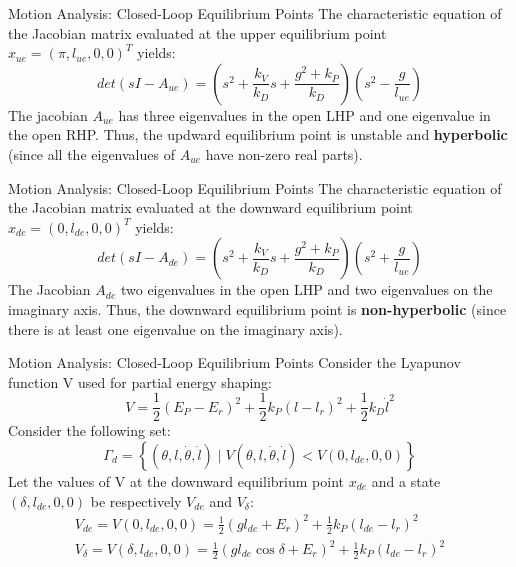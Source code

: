 \documentclass[10pt]{beamer}
\begin{document}
  \begin{frame}{Motion Analysis: Closed-Loop Equilibrium Points}
    The characteristic equation of the Jacobian matrix evaluated
    at the upper equilibrium point $x_{ue} = (\pi, l_{ue}, 0, 0)^T$
    yields:
    \begin{equation*}
      det(sI-A_{ue}) = \left( s^2 + \frac{k_V}{k_D}s +
        \frac{g^2+k_P}{k_D} \right) \left( s^2 - \frac{g}{l_{ue}}\right)
    \end{equation*}
    The jacobian $A_{ue}$ has three eigenvalues in the open LHP and
    one eigenvalue in the open RHP. Thus, the updward equilibrium point
    is unstable and \textbf{hyperbolic} (since all the eigenvalues of $A_{ue}$
    have non-zero real parts).
  \end{frame}

  \begin{frame}{Motion Analysis: Closed-Loop Equilibrium Points}
    The characteristic equation of the Jacobian matrix evaluated
    at the downward equilibrium point $x_{de} = (0, l_{de}, 0, 0)^T$ yields:
    \begin{equation*}
      det(sI-A_{de}) = \left( s^2 + \frac{k_V}{k_D}s +
        \frac{g^2+k_P}{k_D} \right) \left( s^2 + \frac{g}{l_{ue}}\right)
    \end{equation*}
    The Jacobian $A_{de}$ two eigenvalues in the open LHP and two
    eigenvalues on the imaginary axis. Thus, the downward equilibrium
    point is \textbf{non-hyperbolic} (since there
    is at least one eigenvalue on the imaginary axis).
  \end{frame}

  \begin{frame}{Motion Analysis: Closed-Loop Equilibrium Points}
    Consider the Lyapunov function V used for partial energy shaping:
    \begin{equation*}
      V = \frac{1}{2}(E_P-E_r)^2+\frac{1}{2}k_P(l-l_r)^2+
        \frac{1}{2}k_D\dot{l}^2
    \end{equation*}
    Consider the following set:
    \begin{equation*}
      \Gamma_d = \left\{ (\theta, l, \dot{\theta}, \dot{l})
        \mid V(\theta, l, \dot{\theta}, \dot{l}) <
        V(0, l_{de}, 0, 0) \right\}
    \end{equation*}
    Let the values of V at the downward equilibrium point $x_{de}$
    and a state $(\delta, l_{de}, 0, 0)$ be respectively $V_{de}$
    and $V_\delta$:
    \begin{gather*}
      V_{de} = V(0, l_{de}, 0, 0) = \frac{1}{2}(g l_{de} + E_r)^2
        + \frac{1}{2} k_P (l_{de} - l_r)^2 \\
      V_\delta = V(\delta, l_{de}, 0, 0) = \frac{1}{2}(g l_{de}
        \cos\delta + E_r)^2 + \frac{1}{2} k_P (l_{de} - l_r)^2
    \end{gather*}
  \end{frame}
\end{document}
